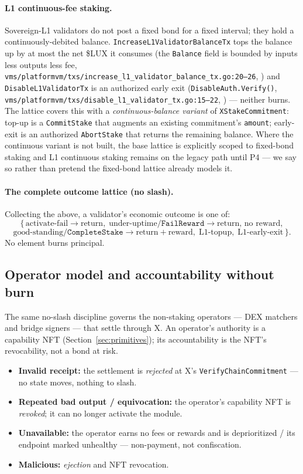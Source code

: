 \paragraph{L1 continuous-fee staking.} Sovereign-L1 validators do not
post a fixed bond for a fixed interval; they hold a continuously-debited
balance. \texttt{IncreaseL1ValidatorBalanceTx} tops the balance up by at most the
net \$LUX it consumes (the \texttt{Balance} field is bounded by
inputs less outputs less fee,
\texttt{vms/platformvm/txs/\allowbreak increase\_l1\_validator\_balance\_tx.go:20--26},
\IMPL{}) and \texttt{DisableL1ValidatorTx} is an authorized early exit
(\texttt{DisableAuth.Verify()},
\texttt{vms/platformvm/txs/\allowbreak disable\_l1\_validator\_tx.go:15--22}, \IMPL{})
--- neither burns. \DESIGN{} The lattice covers this with a
\emph{continuous-balance variant} of \texttt{XStakeCommitment}: top-up is
a \texttt{CommitStake} that augments an existing commitment's
\texttt{amount}; early-exit is an authorized \texttt{AbortStake} that
returns the remaining balance. Where the continuous variant is not built,
the base lattice is explicitly scoped to fixed-bond staking and L1
continuous staking remains on the legacy path until P4 --- we say so
rather than pretend the fixed-bond lattice already models it.

\paragraph{The complete outcome lattice (no slash).} Collecting the
above, a validator's economic outcome is one of:
\[
\{\,\text{activate-fail} \to \text{return},\;
   \text{under-uptime}/\texttt{FailReward} \to \text{return, no reward},
\]
\[
   \text{good-standing}/\texttt{CompleteStake} \to \text{return} + \text{reward},\;
   \text{L1-topup},\; \text{L1-early-exit}\,\}.
\]
No element burns principal.

\subsection{Operator model and accountability without burn}
\label{sec:operator-accountability}

The same no-slash discipline governs the non-staking operators ---
DEX matchers and bridge signers --- that settle through X. An operator's
authority is a capability NFT (Section~\ref{sec:primitives}); its
accountability is the NFT's revocability, not a bond at risk.

\begin{itemize}[leftmargin=2em,nosep]
\item \textbf{Invalid receipt:} the settlement is \emph{rejected} at X's
  \texttt{VerifyChainCommitment} --- no state moves, nothing to slash.
\item \textbf{Repeated bad output / equivocation:} the operator's
  capability NFT is \emph{revoked}; it can no longer activate the module.
\item \textbf{Unavailable:} the operator earns no fees or rewards and is
  deprioritized / its endpoint marked unhealthy --- non-payment, not
  confiscation.
\item \textbf{Malicious:} \emph{ejection} and NFT revocation.
\end{itemize}


